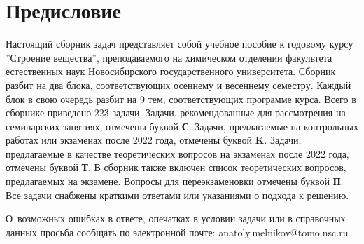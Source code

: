 \footnotesize

\chapter*{Предисловие}

Настоящий сборник задач представляет собой учебное пособие к годовому курсу ''Строение вещества'', преподаваемого на химическом отделении факультета естественных наук Новосибирского государственного университета. Сборник разбит на два блока, соответствующих осеннему и весеннему семестру. Каждый блок в свою очередь разбит на 9 тем, соответствующих программе курса. Всего в сборнике приведено 223 задачи. Задачи, рекомендованные для рассмотрения на семинарских занятиях, отмечены буквой \textbf{С}. Задачи, предлагаемые на контрольных работах или экзаменах после 2022 года, отмечены буквой \textbf{K}. Задачи, предлагаемые в качестве теоретических вопросов на экзаменах после 2022 года, отмечены буквой \textbf{Т}. В сборник также включен список теоретических вопросов, предлагаемых на экзамене. Вопросы для переэкзаменовки отмечены буквой \textbf{П}. Все задачи снабжены краткими ответами или указаниями о подхода к решению. 

О~возможных ошибках в ответе, опечатках в условии задачи или в справочных данных просьба сообщать по электронной почте: anatoly.melnikov@tomo.nsc.ru 

